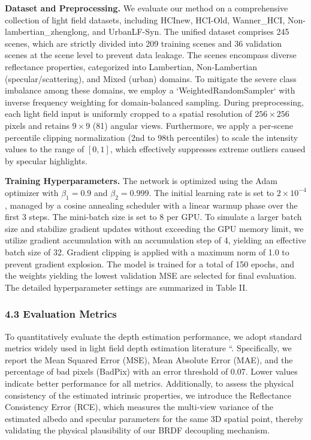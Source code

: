 \documentclass[journal]{IEEEtran}
\begin{document}
\textbf{Dataset and Preprocessing.} 
We evaluate our method on a comprehensive collection of light field datasets, including HCInew, HCI-Old, Wanner\_HCI, Non-lambertian\_zhenglong, and UrbanLF-Syn. The unified dataset comprises 245 scenes, which are strictly divided into 209 training scenes and 36 validation scenes at the scene level to prevent data leakage. The scenes encompass diverse reflectance properties, categorized into Lambertian, Non-Lambertian (specular/scattering), and Mixed (urban) domains. To mitigate the severe class imbalance among these domains, we employ a `WeightedRandomSampler` with inverse frequency weighting for domain-balanced sampling. During preprocessing, each light field input is uniformly cropped to a spatial resolution of \(256 \times 256\) pixels and retains \(9 \times 9\) (81) angular views. Furthermore, we apply a per-scene percentile clipping normalization (2nd to 98th percentiles) to scale the intensity values to the range of \([0, 1]\), which effectively suppresses extreme outliers caused by specular highlights.

\textbf{Training Hyperparameters.} 
The network is optimized using the Adam optimizer with \(\beta_1 = 0.9\) and \(\beta_2 = 0.999\). The initial learning rate is set to \(2 \times 10^{-4}\), managed by a cosine annealing scheduler with a linear warmup phase over the first 3 steps. The mini-batch size is set to 8 per GPU. To simulate a larger batch size and stabilize gradient updates without exceeding the GPU memory limit, we utilize gradient accumulation with an accumulation step of 4, yielding an effective batch size of 32. Gradient clipping is applied with a maximum norm of 1.0 to prevent gradient explosion. The model is trained for a total of 150 epochs, and the weights yielding the lowest validation MSE are selected for final evaluation. The detailed hyperparameter settings are summarized in Table II.

\subsubsection{4.3 Evaluation Metrics}

To quantitatively evaluate the depth estimation performance, we adopt standard metrics widely used in light field depth estimation literature ``. Specifically, we report the Mean Squared Error (MSE), Mean Absolute Error (MAE), and the percentage of bad pixels (BadPix) with an error threshold of 0.07. Lower values indicate better performance for all metrics. Additionally, to assess the physical consistency of the estimated intrinsic properties, we introduce the Reflectance Consistency Error (RCE), which measures the multi-view variance of the estimated albedo and specular parameters for the same 3D spatial point, thereby validating the physical plausibility of our BRDF decoupling mechanism.
\end{document}
